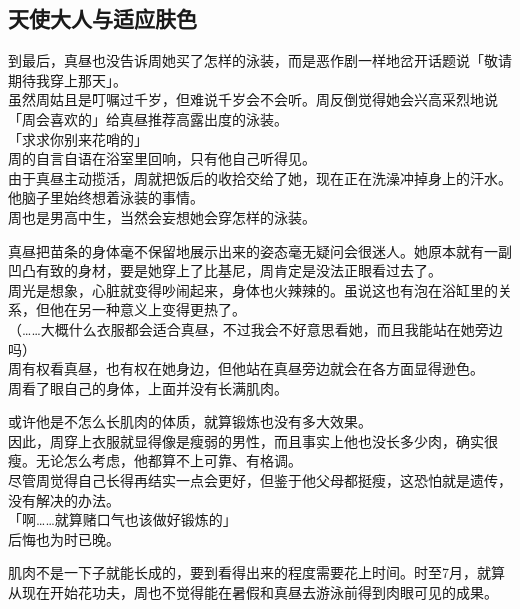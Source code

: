 \subsection{天使大人与适应肤色}

到最后，真昼也没告诉周她买了怎样的泳装，而是恶作剧一样地岔开话题说「敬请期待我穿上那天」。\\

虽然周姑且是叮嘱过千岁，但难说千岁会不会听。周反倒觉得她会兴高采烈地说「周会喜欢的」给真昼推荐高露出度的泳装。\\

「求求你别来花哨的」\\

周的自言自语在浴室里回响，只有他自己听得见。\\

由于真昼主动揽活，周就把饭后的收拾交给了她，现在正在洗澡冲掉身上的汗水。他脑子里始终想着泳装的事情。\\

周也是男高中生，当然会妄想她会穿怎样的泳装。

真昼把苗条的身体毫不保留地展示出来的姿态毫无疑问会很迷人。她原本就有一副凹凸有致的身材，要是她穿上了比基尼，周肯定是没法正眼看过去了。\\

周光是想象，心脏就变得吵闹起来，身体也火辣辣的。虽说这也有泡在浴缸里的关系，但他在另一种意义上变得更热了。\\

（……大概什么衣服都会适合真昼，不过我会不好意思看她，而且我能站在她旁边吗）\\

周有权看真昼，也有权在她身边，但他站在真昼旁边就会在各方面显得逊色。\\

周看了眼自己的身体，上面并没有长满肌肉。

或许他是不怎么长肌肉的体质，就算锻炼也没有多大效果。\\

因此，周穿上衣服就显得像是瘦弱的男性，而且事实上他也没长多少肉，确实很瘦。无论怎么考虑，他都算不上可靠、有格调。\\

尽管周觉得自己长得再结实一点会更好，但鉴于他父母都挺瘦，这恐怕就是遗传，没有解决的办法。\\

「啊……就算赌口气也该做好锻炼的」\\

后悔也为时已晚。

肌肉不是一下子就能长成的，要到看得出来的程度需要花上时间。时至7月，就算从现在开始花功夫，周也不觉得能在暑假和真昼去游泳前得到肉眼可见的成果。\\

